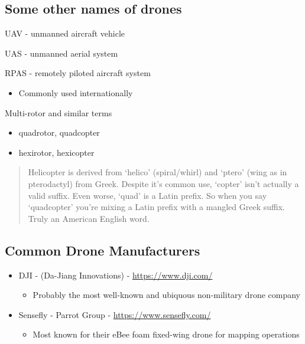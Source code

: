 \documentclass[
]{book}
\providecommand{\tightlist}{%
  \setlength{\itemsep}{0pt}\setlength{\parskip}{0pt}}
\theoremstyle{definition}
\theoremstyle{definition}
\theoremstyle{definition}
\theoremstyle{definition}
\theoremstyle{remark}
\begin{document}
\hypertarget{some-other-names-of-drones}{%
\subsection{Some other names of drones}\label{some-other-names-of-drones}}

UAV - unmanned aircraft vehicle

UAS - unmanned aerial system

RPAS - remotely piloted aircraft system

\begin{itemize}
\tightlist
\item
  Commonly used internationally
\end{itemize}

Multi-rotor and similar terms

\begin{itemize}
\tightlist
\item
  quadrotor, quadcopter
\item
  hexirotor, hexicopter
\end{itemize}

\begin{quote}
Helicopter is derived from `helico' (spiral/whirl) and `ptero' (wing as in pterodactyl) from Greek. Despite it's common use, `copter' isn't actually a valid suffix. Even worse, `quad' is a Latin prefix. So when you say `quadcopter' you're mixing a Latin prefix with a mangled Greek suffix. Truly an American English word.
\end{quote}

\hypertarget{common-drone-manufacturers}{%
\subsection{Common Drone Manufacturers}\label{common-drone-manufacturers}}

\begin{itemize}
\tightlist
\item
  DJI - (Da-Jiang Innovations) - \url{https://www.dji.com/}

  \begin{itemize}
  \tightlist
  \item
    Probably the most well-known and ubiquous non-military drone company
  \end{itemize}
\item
  Sensefly - Parrot Group - \url{https://www.sensefly.com/}

  \begin{itemize}
  \tightlist
  \item
    Most known for their eBee foam fixed-wing drone for mapping operations
  \end{itemize}
\end{itemize}
\end{document}
